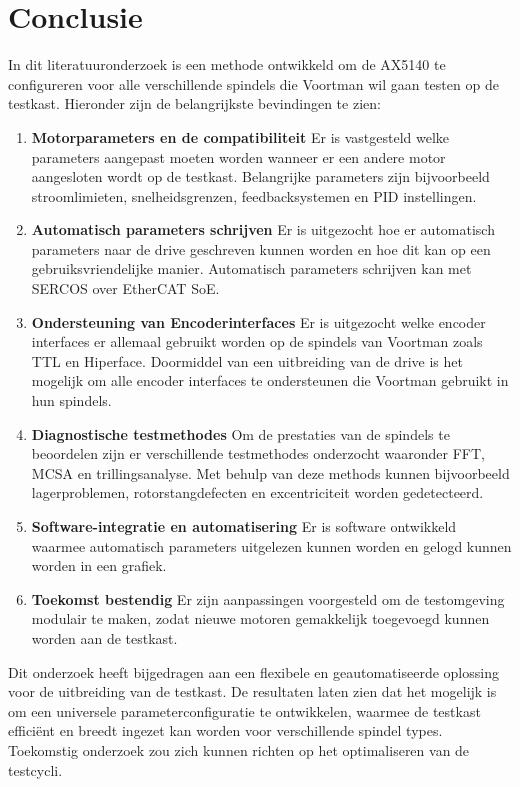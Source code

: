 \section{Conclusie}

In dit literatuuronderzoek is een methode ontwikkeld om de \gls{AX5140} te configureren voor alle verschillende spindels die Voortman wil gaan testen op de testkast. Hieronder zijn de belangrijkste bevindingen te zien:

\begin{enumerate}
	\item \textbf{Motorparameters en de compatibiliteit} Er is vastgesteld welke parameters aangepast moeten worden wanneer er een andere motor aangesloten wordt op de testkast. Belangrijke parameters zijn bijvoorbeeld stroomlimieten, snelheidsgrenzen, feedbacksystemen en PID instellingen.
	
	\item \textbf{Automatisch parameters schrijven} Er is uitgezocht hoe er automatisch parameters naar de drive geschreven kunnen worden en hoe dit kan op een gebruiksvriendelijke manier. Automatisch parameters schrijven kan met \gls{SERCOS} over \gls{EtherCAT} \gls{SoE}.
	
	\item \textbf{Ondersteuning van Encoderinterfaces} Er is uitgezocht welke encoder interfaces er allemaal gebruikt worden op de spindels van Voortman zoals TTL en Hiperface. Doormiddel van een uitbreiding van de drive is het mogelijk om alle encoder interfaces te ondersteunen die Voortman gebruikt in hun spindels.
	
	\item \textbf{Diagnostische testmethodes} Om de prestaties van de spindels te beoordelen zijn er verschillende testmethodes onderzocht waaronder \gls{FFT}, \gls{MCSA} en trillingsanalyse. Met behulp van deze methods kunnen bijvoorbeeld lagerproblemen, rotorstangdefecten en excentriciteit worden gedetecteerd.
	
	\item \textbf{Software-integratie en automatisering} Er is software ontwikkeld waarmee automatisch parameters uitgelezen kunnen worden en gelogd kunnen worden in een grafiek.
	
	\item \textbf{Toekomst bestendig} Er zijn aanpassingen voorgesteld om de testomgeving modulair te maken, zodat nieuwe motoren gemakkelijk toegevoegd kunnen worden aan de testkast.
\end{enumerate}

Dit onderzoek heeft bijgedragen aan een flexibele en geautomatiseerde oplossing voor de uitbreiding van de testkast. De resultaten laten zien dat het mogelijk is om een universele parameterconfiguratie te ontwikkelen, waarmee de testkast efficiënt en breedt ingezet kan worden voor verschillende spindel types. Toekomstig onderzoek zou zich kunnen richten op het optimaliseren van de testcycli.